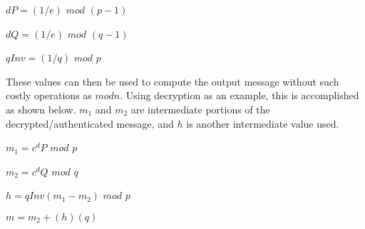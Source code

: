 \documentclass[11pt]{article}
\begin{document}
\begin{itemize}
{\begin{itemize}
{$dP = (1/e)$ $mod$ $(p - 1)$

$dQ = (1/e)$ $mod$ $(q - 1)$

$qInv = (1/q)$ $mod$ $p$

These values can then be used to compute the output message without such costly operations as $mod n$. Using decryption as an example, this is accomplished as shown below. $m_1$ and $m_2$ are intermediate portions of the decrypted/authenticated message, and $h$ is another intermediate value used.\newline

$m_1 = c^dP$ $mod$ $p$

$m_2 = c^dQ$ $mod$ $q$

$h = qInv(m_1 - m_2)$ $mod$ $p$

$m = m_2 + (h)(q)$
\newline 

}
\end{itemize}}
\end{itemize}
\end{document}
